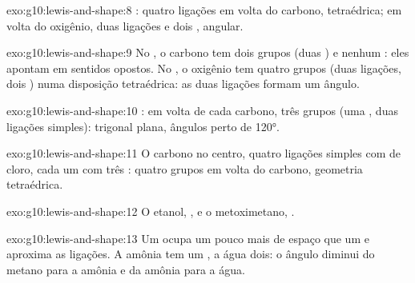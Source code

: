 \begin{solution}{exo:g10:lewis-and-shape:8}
: quatro ligações em volta do
carbono, tetraédrica; em volta do oxigênio, duas ligações e dois , angular.
\end{solution}

\begin{solution}{exo:g10:lewis-and-shape:9}
No , o carbono tem dois grupos (duas ) e nenhum
: eles apontam em sentidos opostos. No , o
oxigênio tem quatro grupos (duas ligações, dois ) numa
disposição tetraédrica: as duas ligações formam um ângulo.
\end{solution}

\begin{solution}{exo:g10:lewis-and-shape:10}
: em volta de cada carbono, três
grupos (uma , duas ligações simples): trigonal plana,
ângulos perto de \ang{120}.
\end{solution}

\begin{solution}{exo:g10:lewis-and-shape:11}
O carbono no centro, quatro ligações simples com  de cloro, cada
um com três : quatro grupos em volta do carbono,
geometria tetraédrica.
\end{solution}

\begin{solution}{exo:g10:lewis-and-shape:12}
O etanol, , e o
metoximetano,
.
\end{solution}

\begin{solution}{exo:g10:lewis-and-shape:13}
Um  ocupa um pouco mais de espaço que um  e
aproxima as ligações. A amônia tem um , a água dois: o
ângulo diminui do metano para a amônia e da amônia para a água.
\end{solution}

